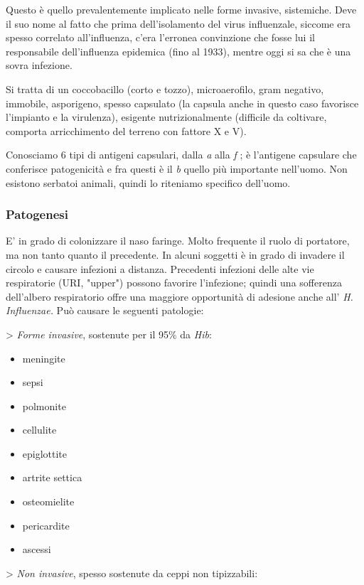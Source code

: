   Questo è quello prevalentemente implicato nelle forme invasive,
  sistemiche. Deve il suo nome al fatto che prima dell'isolamento del
  virus influenzale, siccome era spesso correlato all'influenza, c'era
  l'erronea convinzione che fosse lui il responsabile dell'influenza
  epidemica (fino al 1933), mentre oggi si sa che è una sovra infezione.

  Si tratta di un coccobacillo (corto e tozzo), microaerofilo, gram
  negativo, immobile, asporigeno, spesso capsulato (la capsula anche in
  questo caso favorisce l'impianto e la virulenza), esigente
  nutrizionalmente (difficile da coltivare, comporta arricchimento del
  terreno con fattore X e V).

  Conosciamo 6 tipi di antigeni capsulari, dalla \emph{a} alla \emph{f}
  ; è l'antigene capsulare che conferisce patogenicità e fra questi è il
  \emph{b} quello più importante nell'uomo. Non esistono serbatoi
  animali, quindi lo riteniamo specifico dell'uomo.

 \subsubsection{Patogenesi}

  E' in grado di colonizzare il naso faringe. Molto frequente il ruolo
  di portatore, ma non tanto quanto il precedente. In alcuni soggetti è
  in grado di invadere il circolo e causare infezioni a distanza.
  Precedenti infezioni delle alte vie respiratorie (URI, "upper")
  possono favorire l'infezione; quindi una sofferenza dell'albero
  respiratorio offre una maggiore opportunità di adesione anche all'
  \emph{H. Influenzae.} Può causare le seguenti patologie:

  > \emph{Forme invasive}, sostenute per il 95\% da
  \emph{Hib}:

\begin{itemize}
\item
  meningite
\item
  sepsi
\item
  polmonite
\item
  cellulite
\item
  epiglottite
\item
  artrite settica
\item
  osteomielite
\item
  pericardite
\item
  ascessi
\end{itemize}

  > \emph{Non invasive}, spesso sostenute da ceppi non
  tipizzabili:

